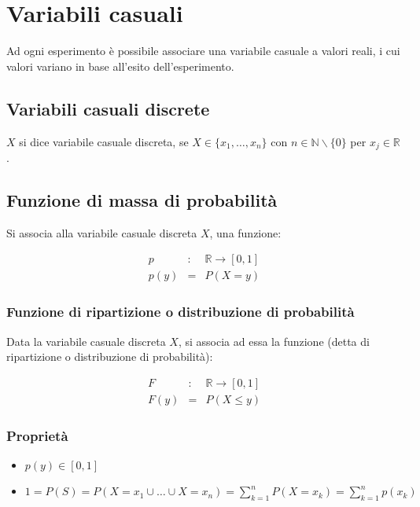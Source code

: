 \documentclass{article}
\begin{document}
\section{Variabili casuali}

Ad ogni esperimento è possibile associare una variabile casuale a valori reali, i cui valori variano in base all'esito dell'esperimento.

\subsection{Variabili casuali discrete}

$X$ si dice variabile casuale discreta, se $X \in \{x_1, \dots, x_n\}$ con $n \in \mathbb{N} \backslash \{0\}$ per $x_j \in \mathbb{R}$.

\subsection{Funzione di massa di probabilità}

Si associa alla variabile casuale discreta $X$, una funzione:

$$
\begin{matrix}
p &:& \mathbb{R} \to [0,1] \\
p(y) &=& P(X = y)
\end{matrix}
$$

\subsubsection{Funzione di ripartizione o distribuzione di probabilità}

Data la variabile casuale discreta $X$, si associa ad essa la funzione (detta di ripartizione o distribuzione di probabilità):

$$
\begin{matrix}
F &:& \mathbb{R} \to [0,1] \\
F(y) &=& P(X \leq y)
\end{matrix}
$$

\subsubsection{Proprietà}

\begin{itemize}
    \item $p(y) \in [0,1]$
    \item $1 = P(S) = P(X = x_1 \cup \dots \cup X = x_n) = \sum^n_{k=1} P(X = x_k) = \sum^n_{k=1} p(x_k)$
\end{itemize}
\end{document}
